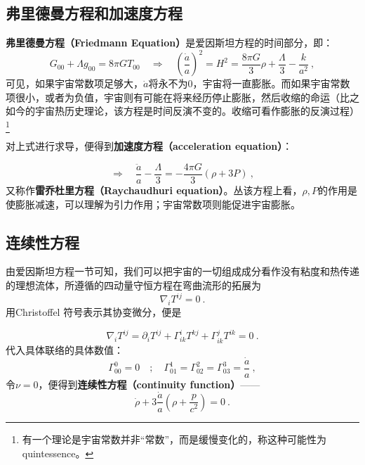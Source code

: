 
\subsection{弗里德曼方程和加速度方程}
\textbf{弗里德曼方程（Friedmann Equation）}是爱因斯坦方程的时间部分，即：
\begin{equation}\label{eq_Frieq_2}G_{00}+\Lambda g_{00}=8\pi GT_{00}\quad\Rightarrow\quad\left(\frac{\dot{a}}{a}\right)^2=H^2=\frac{8\pi G}{3}\rho+\frac{\Lambda}{3}-\frac{k}{a^2}~,\end{equation}
可见，如果宇宙常数项足够大，$\dot a$将永不为0，宇宙将一直膨胀。而如果宇宙常数项很小，或者为负值，宇宙则有可能在将来经历停止膨胀，然后收缩的命运（比之如今的宇宙热历史理论，该方程是时间反演不变的。收缩可看作膨胀的反演过程）\footnote{有一个理论是宇宙常数并非“常数”，而是缓慢变化的，称这种可能性为quintessence。}

对上式进行求导，便得到\textbf{加速度方程（acceleration equation）}：

\begin{equation}\label{eq_Frieq_3}
\Rightarrow\quad\frac{\ddot{a}}{a}-\frac{\Lambda}{3}=-\frac{4\pi G}{3}(\rho+3P)~,
\end{equation}
又称作\textbf{雷乔杜里方程（Raychaudhuri equation）}。丛该方程上看，$\rho,P$的作用是使膨胀减速，可以理解为引力作用；宇宙常数项则能促进宇宙膨胀。

\subsection{连续性方程}
由爱因斯坦方程一节可知，我们可以把宇宙的一切组成成分看作没有粘度和热传递的理想流体，所遵循的四动量守恒方程在弯曲流形的拓展为
\begin{equation}
\nabla_{i}T^{ij}=0~.
\end{equation}
用Christoffel 符号表示其协变微分，便是

\begin{equation}\nabla_iT^{ij}=\partial_iT^{ij}+\Gamma_{ik}^iT^{kj}+\Gamma_{ik}^jT^{ik}=0~.
\end{equation}
代入具体联络的具体数值：
\begin{equation}\Gamma_{00}^0=0\quad;\quad\Gamma_{01}^1=\Gamma_{02}^2=\Gamma_{03}^3=\frac{\dot{a}}{a}~,\end{equation}
令$\nu=0$，便得到\textbf{连续性方程（continuity function）}——
\begin{equation}\label{eq_Frieq_1}
\dot{\rho}+3\frac{\dot{a}}{a}\left(\rho+\frac{p}{c^2}\right)=0~.
\end{equation}
